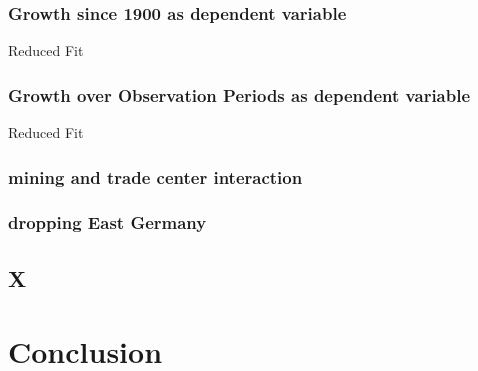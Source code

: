 \documentclass[
12pt, %
english, %
onehalfspacing, %
oneside,
headsepline, %
openany
]{MastersDoctoralThesis} %
\begin{document}
\subsection{Growth since 1900 as dependent variable}
Reduced Fit

\subsection{Growth over Observation Periods as dependent variable}
Reduced Fit 

\subsection{mining and trade center interaction}

\subsection{dropping East Germany}

\section{X}

\newpage

\chapter{Conclusion}
 
 
\appendix %





 
\backmatter
\printbibliography[heading=bibintoc]


\end{document}
